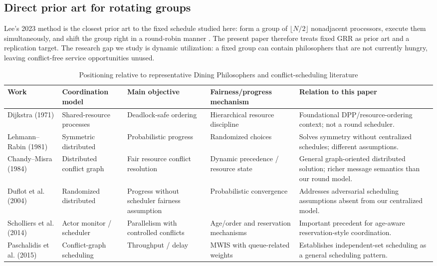 \documentclass[10pt,journal]{IEEEtran}
\begin{document}
\subsection{Direct prior art for rotating groups}
Lee's 2023 method is the closest prior art to the fixed schedule studied here: form a group of $\lfloor N/2\rfloor$ nonadjacent processors, execute them simultaneously, and shift the group right in a round-robin manner \cite{lee2023}. The present paper therefore treats fixed GRR as prior art and a replication target. The research gap we study is dynamic utilization: a fixed group can contain philosophers that are not currently hungry, leaving conflict-free service opportunities unused.

\begin{table}[t]
\centering
\caption{Positioning relative to representative Dining Philosophers and conflict-scheduling literature}
\label{tab:lit}
\footnotesize
\begin{tabular}{p{2.4cm}p{2.5cm}p{2.4cm}p{2.3cm}p{5.0cm}}
\toprule
Work & Coordination model & Main objective & Fairness/progress mechanism & Relation to this paper\\
\midrule
Dijkstra (1971) \cite{dijkstra1971} & Shared-resource processes & Deadlock-safe ordering & Hierarchical resource discipline & Foundational DPP/resource-ordering context; not a round scheduler.\\
Lehmann--Rabin (1981) \cite{lehmann1981} & Symmetric distributed & Probabilistic progress & Randomized choices & Solves symmetry without centralized schedules; different assumptions.\\
Chandy--Misra (1984) \cite{chandy1984} & Distributed conflict graph & Fair resource conflict resolution & Dynamic precedence / resource state & General graph-oriented distributed solution; richer message semantics than our round model.\\
Duflot et al. (2004) \cite{duflot2004} & Randomized distributed & Progress without scheduler fairness assumption & Probabilistic convergence & Addresses adversarial scheduling assumptions absent from our centralized model.\\
Scholliers et al. (2014) \cite{scholliers2014} & Actor monitor / scheduler & Parallelism with controlled conflicts & Age/order and reservation mechanisms & Important precedent for age-aware reservation-style coordination.\\
Paschalidis et al. (2015) \cite{paschalidis2015} & Conflict-graph scheduling & Throughput / delay & MWIS with queue-related weights & Establishes independent-set scheduling as a general scheduling pattern.\\

\end{tabular}
\end{table}
\end{document}
